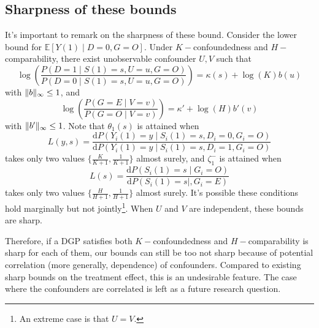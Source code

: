 \documentclass[12pt]{article}
\newtheorem{rmk}{Remark}
\newcommand{\Ep}{\mathbb{E}}
\DeclarePairedDelimiter{\norm}{\lVert}{\rVert}
\begin{document}
	\subsection{Sharpness of these bounds}
	It's important to remark on the sharpness of these bound. Consider the lower bound for $\Ep[Y(1) \mid D = 0, G = O]$. Under $K-$confoundedness and $H-$comparability, there exist unobservable confounder $U,V$ such that $$\log \left(\frac{P(D=1 \mid S(1) = s, U=u, G = O)}{P(D=0 \mid S(1)=s, U=u, G = O)}\right)=\kappa(s)+\log (K) b(u)$$ with $\norm{b}_{\infty} \leq 1$, and 
	$$\log \left(\frac{P(G=E \mid V=v)}{P(G=O \mid V=v)}\right)=\kappa'+\log (H) b'(v)$$ with $\norm{b'}_{\infty} \leq 1$. Note that $\theta_1(s)$ is attained when
	$$L(y,s) = \frac{\mathrm{d} P(Y_i(1) = y \mid S_i(1) = s, D_i =0, G_i = O)}{\mathrm{d} P(Y_i(1) = y \mid S_i(1) = s, D_i = 1, G_i = O)}$$ takes only two values  $\{\frac{K}{K + 1}, \frac{1}{K + 1}\}$ almost surely, and $\zeta_1^-$ is attained when  
	$$L(s) = \frac{\mathrm{d} P(S_i(1) = s \mid G_i = O)}{\mathrm{d} P(S_i(1) = s \mid , G_i = E)}$$
	takes only two values  $\{\frac{H}{H + 1}, \frac{1}{H + 1}\}$ almost surely. It's possible these conditions hold marginally but not jointly\footnote{An extreme case is that $U = V$.}. When $U$ and $V$ are independent, these bounds are sharp.
	
	Therefore, if a DGP satisfies both $K-$confoundedness and $H-$comparability is sharp for each of them, our bounds can still be too not sharp because of potential correlation (more generally, dependence) of confounders. Compared to existing sharp bounds on the treatment effect, this is an undesirable feature. The case where the confounders are correlated is left as a future research question.
	
\end{document}
